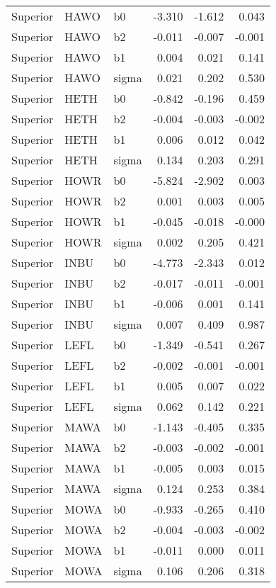 \begin{table}[ht]
\begin{center}
\begin{tabular}{lllrrr}
  Superior & HAWO & b0 & -3.310 & -1.612 & 0.043 \\ 
  Superior & HAWO & b2 & -0.011 & -0.007 & -0.001 \\ 
  Superior & HAWO & b1 & 0.004 & 0.021 & 0.141 \\ 
  Superior & HAWO & sigma & 0.021 & 0.202 & 0.530 \\ 
  Superior & HETH & b0 & -0.842 & -0.196 & 0.459 \\ 
  Superior & HETH & b2 & -0.004 & -0.003 & -0.002 \\ 
  Superior & HETH & b1 & 0.006 & 0.012 & 0.042 \\ 
  Superior & HETH & sigma & 0.134 & 0.203 & 0.291 \\ 
  Superior & HOWR & b0 & -5.824 & -2.902 & 0.003 \\ 
  Superior & HOWR & b2 & 0.001 & 0.003 & 0.005 \\ 
  Superior & HOWR & b1 & -0.045 & -0.018 & -0.000 \\ 
  Superior & HOWR & sigma & 0.002 & 0.205 & 0.421 \\ 
  Superior & INBU & b0 & -4.773 & -2.343 & 0.012 \\ 
  Superior & INBU & b2 & -0.017 & -0.011 & -0.001 \\ 
  Superior & INBU & b1 & -0.006 & 0.001 & 0.141 \\ 
  Superior & INBU & sigma & 0.007 & 0.409 & 0.987 \\ 
  Superior & LEFL & b0 & -1.349 & -0.541 & 0.267 \\ 
  Superior & LEFL & b2 & -0.002 & -0.001 & -0.001 \\ 
  Superior & LEFL & b1 & 0.005 & 0.007 & 0.022 \\ 
  Superior & LEFL & sigma & 0.062 & 0.142 & 0.221 \\ 
  Superior & MAWA & b0 & -1.143 & -0.405 & 0.335 \\ 
  Superior & MAWA & b2 & -0.003 & -0.002 & -0.001 \\ 
  Superior & MAWA & b1 & -0.005 & 0.003 & 0.015 \\ 
  Superior & MAWA & sigma & 0.124 & 0.253 & 0.384 \\ 
  Superior & MOWA & b0 & -0.933 & -0.265 & 0.410 \\ 
  Superior & MOWA & b2 & -0.004 & -0.003 & -0.002 \\ 
  Superior & MOWA & b1 & -0.011 & 0.000 & 0.011 \\ 
  Superior & MOWA & sigma & 0.106 & 0.206 & 0.318 \\ 

\end{tabular}
\end{center}
\end{table}
